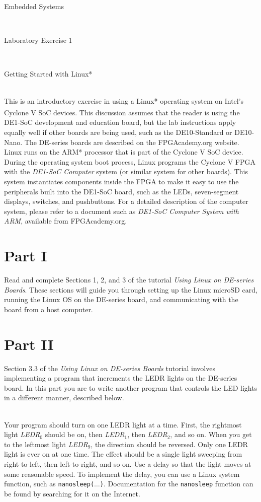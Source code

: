 \documentclass[epsfig,10pt,fullpage]{article}
\newcommand{\LabNum}{1}
\begin{document}
\centerline{\huge Embedded Systems}
~\\
\centerline{\huge Laboratory Exercise \LabNum}
~\\
\centerline{\large Getting Started with Linux*}
~\\

\noindent
This is an introductory exercise in using a Linux* operating system on Intel's Cyclone\textsuperscript{\textregistered} V SoC 
devices. This discussion assumes that the reader is using the DE1-SoC development and 
education board, but the lab instructions apply equally well if other boards are being used,
such as the DE10-Standard or DE10-Nano. The DE-series boards are described on the 
FPGAcademy.org website.  Linux runs on the ARM* processor that is part 
of the Cyclone V SoC device. During the operating system boot process, Linux programs the 
Cyclone V FPGA with the \textit{DE1-SoC Computer} system (or similar system for other
boards). This system instantiates components inside the FPGA to make it easy to use the 
peripherals built into the DE1-SoC board, such as the LEDs, seven-segment displays, switches, 
and pushbuttons. For a detailed description of the computer system, please refer to 
a document such as \textit{DE1-SoC Computer System with ARM}, available from FPGAcademy.org.

\section*{Part I}
\noindent
Read and complete Sections 1, 2, and 3 of the tutorial \textit{Using Linux on DE-series Boards}.
These sections will guide you through setting up the Linux microSD card, running the 
Linux OS on the DE-series board, and communicating with the board from a host computer. 

\section*{Part II}
\noindent
Section 3.3 of the \textit{Using Linux on DE-series Boards} tutorial involves implementing a
program that increments the LEDR lights on the DE-series board. In this part you are to
write another program that controls the LED lights in a different manner, described below.

~\\
\noindent
Your program should turn on one LEDR light at a time. First, the rightmost light 
{\it LEDR}$_0$ should be on, then {\it LEDR}$_1$, then {\it LEDR}$_2$, and so on. When you
get to the leftmost light {\it LEDR}$_{9}$, the direction should be reversed. Only one 
LEDR light is ever on at one time. The effect should be a single light sweeping from 
right-to-left, then left-to-right, and so on.  
Use a delay so that the light moves at some reasonable speed. To implement the delay, you
can use a Linux system function, such as \texttt{nanosleep($\ldots$)}. Documentation for 
the \texttt{nanosleep} function can be found by searching for it on the Internet.
\end{document}
